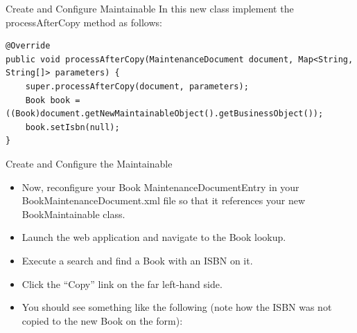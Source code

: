\documentclass[xcolor=dvipsnames,14pt,professionalfonts]{beamer}
\begin{document}
 \begin{frame}[fragile]{Create and Configure Maintainable}
 In this new class implement the processAfterCopy method as follows:
 \begin{verbatim}
@Override
public void processAfterCopy(MaintenanceDocument document, Map<String, String[]> parameters) {
    super.processAfterCopy(document, parameters);
    Book book = ((Book)document.getNewMaintainableObject().getBusinessObject());
    book.setIsbn(null);
}
    \end{verbatim}
\end{frame}

    \begin{frame}{Create and Configure the Maintainable}
     \begin{itemize}
       \item Now, reconfigure your Book MaintenanceDocumentEntry in your BookMaintenanceDocument.xml file so that it references your new BookMaintainable class.
       \item Launch the web application and navigate to the Book lookup.
       \item Execute a search and find a Book with an ISBN on it.
         \item Click the “Copy” link on the far left-hand side.
         \item You should see something like the following (note how the ISBN was not copied to the new Book on the form):
      \end{itemize}     
    \end{frame}
           
\end{document}
